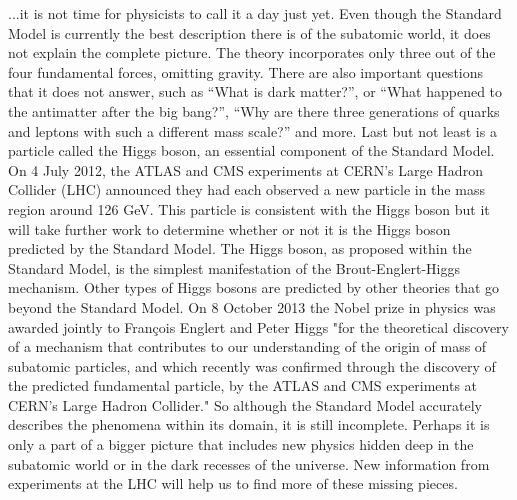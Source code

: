 ...it is not time for physicists to call it a day just yet. Even though the Standard Model is currently the best description there is of the subatomic world, it does not explain the complete picture. The theory incorporates only three out of the four fundamental forces, omitting gravity. There are also important questions that it does not answer, such as “What is dark matter?”, or “What happened to the antimatter after the big bang?”, “Why are there three generations of quarks and leptons with such a different mass scale?” and more. Last but not least is a particle called the Higgs boson, an essential component of the Standard Model.
On 4 July 2012, the ATLAS and CMS experiments at CERN's Large Hadron Collider (LHC) announced they had each observed a new particle in the mass region around 126 GeV. This particle is consistent with the Higgs boson but it will take further work to determine whether or not it is the Higgs boson predicted by the Standard Model. The Higgs boson, as proposed within the Standard Model, is the simplest manifestation of the Brout-Englert-Higgs mechanism. Other types of Higgs bosons are predicted by other theories that go beyond the Standard Model.
On 8 October 2013 the Nobel prize in physics was awarded jointly to François Englert and Peter Higgs "for the theoretical discovery of a mechanism that contributes to our understanding of the origin of mass of subatomic particles, and which recently was confirmed through the discovery of the predicted fundamental particle, by the ATLAS and CMS experiments at CERN's Large Hadron Collider."
So although the Standard Model accurately describes the phenomena within its domain, it is still incomplete. Perhaps it is only a part of a bigger picture that includes new physics hidden deep in the subatomic world or in the dark recesses of the universe. New information from experiments at the LHC will help us to find more of these missing pieces.